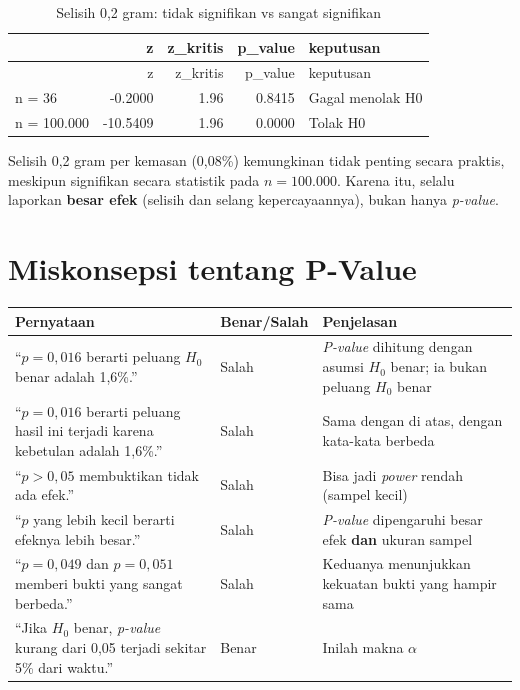 \documentclass[
  indonesian,
  letterpaper,
]{book}
\newcounter{none} %
\begin{document}
\begin{longtable}[]{@{}lrrrl@{}}
\caption{Selisih 0,2 gram: tidak signifikan vs sangat
signifikan}\tabularnewline
\toprule\noalign{}
& z & z\_kritis & p\_value & keputusan \\
\midrule\noalign{}
\endfirsthead
\toprule\noalign{}
& z & z\_kritis & p\_value & keputusan \\
\midrule\noalign{}
\endhead
\bottomrule\noalign{}
\endlastfoot
n = 36 & -0.2000 & 1.96 & 0.8415 & Gagal menolak H0 \\
n = 100.000 & -10.5409 & 1.96 & 0.0000 & Tolak H0 \\
\end{longtable}

Selisih 0,2 gram per kemasan (0,08\%) kemungkinan tidak penting secara
praktis, meskipun signifikan secara statistik pada \(n = 100.000\).
Karena itu, selalu laporkan \textbf{besar efek} (selisih dan selang
kepercayaannya), bukan hanya \emph{p-value}.

\section{Miskonsepsi tentang P-Value}\label{miskonsepsi-tentang-p-value}

{\def\LTcaptype{none} %
\begin{longtable}[]{@{}
  >{\raggedright\arraybackslash}p{}
  >{\raggedright\arraybackslash}p{}
  >{\raggedright\arraybackslash}p{}@{}}
\toprule\noalign{}
\begin{minipage}[b]{\linewidth}\raggedright
Pernyataan
\end{minipage} & \begin{minipage}[b]{\linewidth}\raggedright
Benar/Salah
\end{minipage} & \begin{minipage}[b]{\linewidth}\raggedright
Penjelasan
\end{minipage} \\
\midrule\noalign{}
\endhead
\bottomrule\noalign{}
\endlastfoot
``\(p = 0{,}016\) berarti peluang \(H_0\) benar adalah 1,6\%.'' & Salah
& \emph{P-value} dihitung dengan asumsi \(H_0\) benar; ia bukan peluang
\(H_0\) benar \\
``\(p = 0{,}016\) berarti peluang hasil ini terjadi karena kebetulan
adalah 1,6\%.'' & Salah & Sama dengan di atas, dengan kata-kata
berbeda \\
``\(p > 0{,}05\) membuktikan tidak ada efek.'' & Salah & Bisa jadi
\emph{power} rendah (sampel kecil) \\
``\(p\) yang lebih kecil berarti efeknya lebih besar.'' & Salah &
\emph{P-value} dipengaruhi besar efek \textbf{dan} ukuran sampel \\
``\(p = 0{,}049\) dan \(p = 0{,}051\) memberi bukti yang sangat
berbeda.'' & Salah & Keduanya menunjukkan kekuatan bukti yang hampir
sama \\
``Jika \(H_0\) benar, \emph{p-value} kurang dari 0,05 terjadi sekitar
5\% dari waktu.'' & Benar & Inilah makna \(\alpha\) \\
\end{longtable}
}
\end{document}
